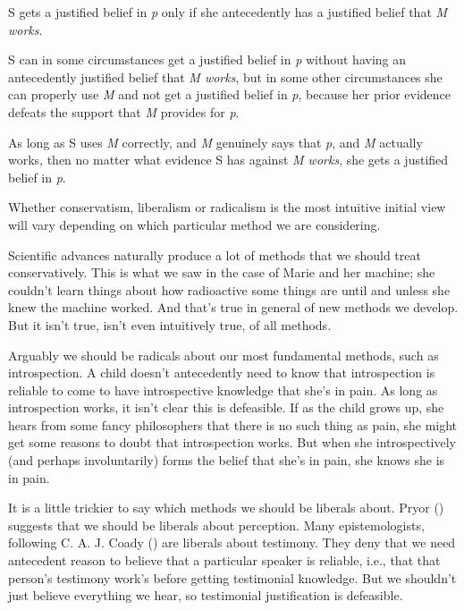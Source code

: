 \documentclass[
  10pt,
  letterpaper,
  twoside]{scrbook}
\providecommand{\tightlist}{%
  \setlength{\itemsep}{0pt}\setlength{\parskip}{0pt}}\usepackage{longtable,booktabs,array}
\begin{document}
\begin{description}
\tightlist
\item[Conservatism]
S gets a justified belief in \emph{p} only if she antecedently has a
justified belief that \emph{M works}.
\item[Liberalism]
S can in some circumstances get a justified belief in \emph{p} without
having an antecedently justified belief that \emph{M works}, but in some
other circumstances she can properly use \emph{M} and not get a
justified belief in \emph{p}, because her prior evidence defeats the
support that \emph{M} provides for \emph{p}.
\item[Radicalism]
As long as S uses \emph{M} correctly, and \emph{M} genuinely says that
\emph{p}, and \emph{M} actually works, then no matter what evidence S
has against \emph{M works}, she gets a justified belief in \emph{p}.
\end{description}

Whether conservatism, liberalism or radicalism is the most intuitive
initial view will vary depending on which particular method we are
considering.

Scientific advances naturally produce a lot of methods that we should
treat conservatively. This is what we saw in the case of {Marie} and her
machine; she couldn't learn things about how radioactive some things are
until and unless she knew the machine worked. And that's true in general
of new methods we develop. But it isn't true, isn't even intuitively
true, of all methods.

Arguably we should be radicals about our most fundamental methods, such
as introspection. A child doesn't antecedently need to know that
introspection is reliable to come to have introspective knowledge that
she's in pain. As long as introspection works, it isn't clear this is
defeasible. If as the child grows up, she hears from some fancy
philosophers that there is no such thing as pain, she might get some
reasons to doubt that introspection works. But when she introspectively
(and perhaps involuntarily) forms the belief that she's in pain, she
knows she is in pain.

It is a little trickier to say which methods we should be liberals
about. Pryor () suggests that we should be
liberals about perception. Many epistemologists, following C. A. J.
Coady () are liberals about testimony.
They deny that we need antecedent reason to believe that a particular
speaker is reliable, i.e., that that person's testimony work's before
getting testimonial knowledge. But we shouldn't just believe everything
we hear, so testimonial justification is defeasible.
\end{document}
